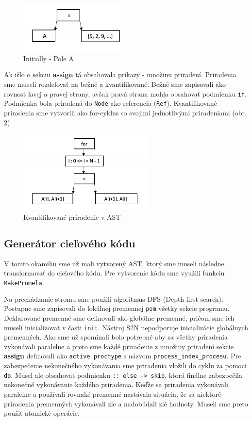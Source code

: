 \begin{figure}[H]
    \centerline{\includegraphics[width=0.5\textwidth]{images/for}}
    \caption[Initially - Pole A]{Initially - Pole A}
    \label{img:for}
\end{figure}

Ak išlo o sekciu \textbf{assign} tá obsahovala príkazy - množinu priradení. Priradenia sme museli rozdeľovať
na bežné a kvantifikované. Bežné sme zapisovali ako rovnosť ľavej a pravej strany, avšak pravá strana mohla 
obsahovať podmienku \texttt{if}. Podmienka bola priradená do \texttt{Node} ako referencia (\texttt{Ref}).
Kvantifikované priradenia sme vytvorili ako for-cyklus so svojimi jednotlivými priradeniami (obr. \ref{img:for2}). 

\begin{figure}[H]
    \centerline{\includegraphics[width=0.6\textwidth]{images/for2}}
    \caption[Kvantifikované priradenie v AST]{Kvantifikované priradenie v AST}
    \label{img:for2}
\end{figure}

\subsection{Generátor cieľového kódu}
V tomto okamihu sme už mali vytvorený AST, ktorý sme museli následne transformovať do cieľového kódu. 
Pre vytvorenie kódu sme využili funkciu \texttt{MakePromela}. 

Na prechádzanie stromu sme použili algoritmus DFS (Depth-first search). Postupne sme zapisovali do lokálnej
premennej \texttt{pom} všetky sekcie programu. Deklarované premenné sme definovali ako globálne premenné, 
pričom sme ich museli inicializovať v časti \texttt{init}. Nástroj S2N nepodporuje inicializácie 
globálnych premenných. Ako sme už spomínali bolo potrebné aby sa všetky priradenia vykonávali 
paralelne a preto sme každé priradenie z množiny priradení sekcie \textbf{assign} definovali 
ako \texttt{active proctype} s názvom \texttt{process\_index\_procesu}. Pre zabezpečenie nekonečného 
vykonávania sme priradenia vložili do cyklu za pomoci \texttt{do}. Musel ale obsahovať podmienku 
\texttt{:: else -> skip}, ktorá finálne zabezpečila nekonečné vykonávanie každého priradenia. 
Keďže sa priradenia vykonávali paralelne a používali rovnaké premenné nastávala situácia, že sa niektoré
priradenia premenných vykonávali zle a nadobúdali zlé hodnoty. Museli sme preto použiť atomické operácie.

